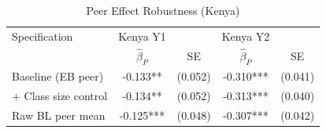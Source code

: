 \begin{table}[htbp]
\centering\small
\caption{Peer Effect Robustness (Kenya)}
\label{tab:peer_robust}
\begin{tabular}{lcccc}
\toprule
Specification & Kenya Y1 & & Kenya Y2 & \\
 & $\hat{\beta}_P$ & SE & $\hat{\beta}_P$ & SE \\
\midrule
Baseline (EB peer) & -0.133** & (0.052) & -0.310*** & (0.041) \\
+ Class size control & -0.134** & (0.052) & -0.313*** & (0.040) \\
Raw BL peer mean & -0.125*** & (0.048) & -0.307*** & (0.042) \\
\bottomrule
\end{tabular}
\par\smallskip{}
\end{table}